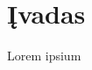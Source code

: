 \documentclass[../gnss_interference_resistant_thesis.tex]{subfiles}
\begin{document}
\section{Įvadas}

Lorem ipsium
\end{document}
